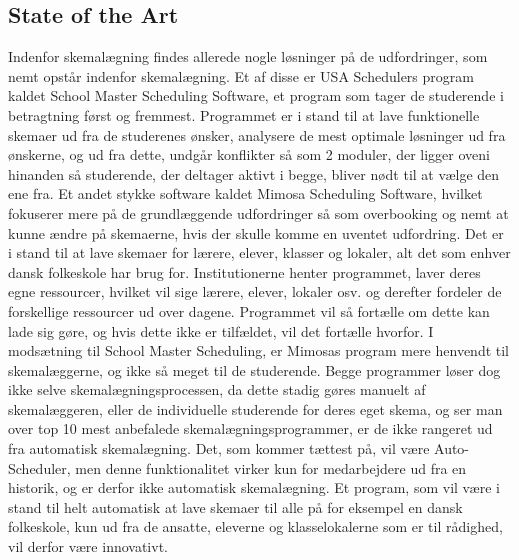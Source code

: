 \subsection{State of the Art}
Indenfor skemalægning findes allerede nogle løsninger på de udfordringer, som nemt opstår indenfor skemalægning. Et af disse er USA Schedulers program kaldet School Master Scheduling Software\cite{USAS}, et program som tager de studerende i betragtning først og fremmest. Programmet er i stand til at lave funktionelle skemaer ud fra de studerenes ønsker, analysere de mest optimale løsninger ud fra ønskerne, og ud fra dette, undgår konflikter så som 2 moduler, der ligger oveni hinanden så studerende, der deltager aktivt i begge, bliver nødt til at vælge den ene fra.
Et andet stykke software kaldet Mimosa Scheduling Software\cite{Mimosa}, hvilket fokuserer mere på de grundlæggende udfordringer så som overbooking og nemt at kunne ændre på skemaerne, hvis der skulle komme en uventet udfordring. Det er i stand til at lave skemaer for lærere, elever, klasser og lokaler, alt det som enhver dansk folkeskole har brug for. Institutionerne henter programmet, laver deres egne ressourcer, hvilket vil sige lærere, elever, lokaler osv. og derefter fordeler de forskellige ressourcer ud over dagene. Programmet vil så fortælle om dette kan lade sig gøre, og hvis dette ikke er tilfældet, vil det fortælle hvorfor\cite{MimosaTutorial}. I modsætning til School Master Scheduling, er Mimosas program mere henvendt til skemalæggerne, og ikke så meget til de studerende. Begge programmer løser dog ikke selve skemalægningsprocessen, da dette stadig gøres manuelt af skemalæggeren, eller de individuelle studerende for deres eget skema, og ser man over top 10 mest anbefalede skemalægningsprogrammer\cite{top10Schedulers}, er de ikke rangeret ud fra automatisk skemalægning. Det, som kommer tættest på, vil være Auto-Scheduler, men denne funktionalitet virker kun for medarbejdere ud fra en historik, og er derfor ikke automatisk skemalægning. Et program, som vil være i stand til helt automatisk at lave skemaer til alle på for eksempel en dansk folkeskole, kun ud fra de ansatte, eleverne og klasselokalerne som er til rådighed, vil derfor være innovativt.
